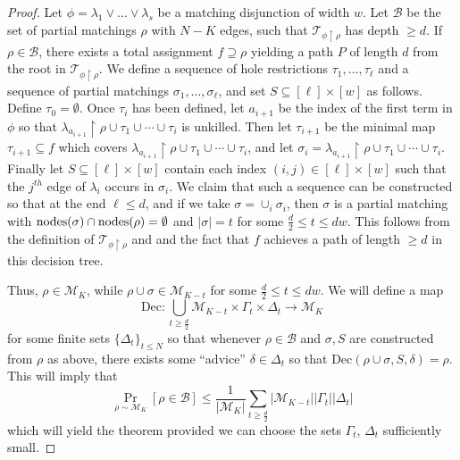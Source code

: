 \begin{proof}
Let $\phi= \lambda_1 \lor \ldots \lor \lambda_s$ be a matching disjunction of width $w$. Let $\mathcal{B}$ be the set of partial matchings $\rho$ with $N - K$ edges, such that $\mathcal{T}_{\phi \upharpoonright \rho}$ has depth $\geq d$. 
If $\rho \in \mathcal{B}$, there exists a total assignment $f \supseteq \rho$ yielding a path $P$ of length $d$ from the root in $\mathcal{T}_{\phi \upharpoonright \rho}$. We define a sequence of hole restrictions $\tau_1,\dots,\tau_{\ell}$ and a sequence of partial matchings $\sigma_1,\ldots,\sigma_{\ell}$, and set $S \subseteq [\ell] \times [w]$ as follows. Define $\tau_0 = \emptyset$. Once $\tau_i$ has been defined, let $a_{i+1}$ be the index of the first term in $\phi$ so that $\lambda_{a_{i+1}} \upharpoonright \rho \cup \tau_1 \cup \cdots \cup \tau_i$ is unkilled. Then let $\tau_{i+1}$ be the minimal map $\tau_{i+1} \subseteq f$ which covers $\lambda_{a_{i+1}} \upharpoonright \rho \cup \tau_1 \cup \cdots \cup \tau_i$, and let $\sigma_i = \lambda_{a_{i+1}} \upharpoonright \rho \cup \tau_1 \cup \cdots \cup \tau_i$. Finally let $S \subseteq [\ell] \times [w]$ contain each index $(i,j) \in [\ell] \times [w]$ such that the $j^{th}$ edge of $\lambda_i$ occurs in $\sigma_i$. We claim that such a sequence can be constructed so that at the end $\ell \leq d$, and if we take $\sigma = \cup_i \sigma_i$, then $\sigma$ is a partial matching with $\mathrm{nodes}(\sigma) \cap \mathrm{nodes}(\rho) = \emptyset$ and $|\sigma|=t$ for some $\frac{d}{2} \leq t \leq dw$. This follows from the definition of $\mathcal{T}_{\phi \upharpoonright \rho}$ and and the fact that $f$ achieves a path of length $\geq d$ in this decision tree.

Thus, $\rho \in \mathcal{M}_K$, while $\rho \cup \sigma \in \mathcal{M}_{K-t}$ for some $\frac{d}{2} \leq t \leq dw$. We will define a map 
\[
\mathrm{Dec}: \bigcup\limits_{t \geq \frac{d}{2}}\mathcal{M}_{K-t}  \times \Gamma_t \times \Delta_t \to \mathcal{M}_K
\]
for some finite sets $\{\Delta_t\}_{t \leq N}$ so that whenever $\rho \in \mathcal{B}$ and $\sigma, S$ are constructed from $\rho$ as above, there exists some ``advice'' $\delta \in \Delta_t$ so that $\mathrm{Dec}(\rho \cup \sigma, S,\delta) = \rho$. This will imply that
\[
\Pr_{\rho \sim \mathcal{M}_{K}}[\rho \in \mathcal{B}] \leq \frac{1}{|\mathcal{M}_K|} \sum\limits_{t \geq \frac{d}{2}} |\mathcal{M}_{K-t}|  |\Gamma_t| |\Delta_t|
\]
which will yield the theorem provided we can choose the sets $\Gamma_t$, $\Delta_t$ sufficiently small.


\end{proof}
